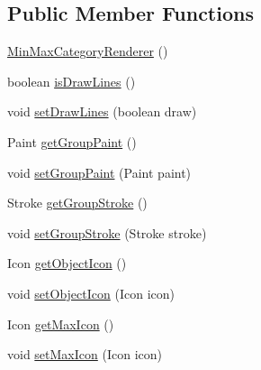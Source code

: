 \subsection*{Public Member Functions}
\begin{DoxyCompactItemize}
\item 
\mbox{\hyperlink{classorg_1_1jfree_1_1chart_1_1renderer_1_1category_1_1_min_max_category_renderer_ab0d03ac160d311fdabb36a5a31b32256}{Min\+Max\+Category\+Renderer}} ()
\item 
boolean \mbox{\hyperlink{classorg_1_1jfree_1_1chart_1_1renderer_1_1category_1_1_min_max_category_renderer_a139adf4191e4232fbc573cf7b41e1b3f}{is\+Draw\+Lines}} ()
\item 
void \mbox{\hyperlink{classorg_1_1jfree_1_1chart_1_1renderer_1_1category_1_1_min_max_category_renderer_a56574945e072d72284090450e075b509}{set\+Draw\+Lines}} (boolean draw)
\item 
Paint \mbox{\hyperlink{classorg_1_1jfree_1_1chart_1_1renderer_1_1category_1_1_min_max_category_renderer_a2f27a761a6930c84f2e979fade45b790}{get\+Group\+Paint}} ()
\item 
void \mbox{\hyperlink{classorg_1_1jfree_1_1chart_1_1renderer_1_1category_1_1_min_max_category_renderer_a15c0d6beff7203d2b49ab160cc7b9124}{set\+Group\+Paint}} (Paint paint)
\item 
Stroke \mbox{\hyperlink{classorg_1_1jfree_1_1chart_1_1renderer_1_1category_1_1_min_max_category_renderer_a4035cc8dee0f3855b46d986e7430cab3}{get\+Group\+Stroke}} ()
\item 
void \mbox{\hyperlink{classorg_1_1jfree_1_1chart_1_1renderer_1_1category_1_1_min_max_category_renderer_a57979a0064c20312d25a3235310c89bf}{set\+Group\+Stroke}} (Stroke stroke)
\item 
Icon \mbox{\hyperlink{classorg_1_1jfree_1_1chart_1_1renderer_1_1category_1_1_min_max_category_renderer_a0f7cfaff627bb78993c0f99d312cdd22}{get\+Object\+Icon}} ()
\item 
void \mbox{\hyperlink{classorg_1_1jfree_1_1chart_1_1renderer_1_1category_1_1_min_max_category_renderer_af86364bce323a2f335493c088181325d}{set\+Object\+Icon}} (Icon icon)
\item 
Icon \mbox{\hyperlink{classorg_1_1jfree_1_1chart_1_1renderer_1_1category_1_1_min_max_category_renderer_a0c66a866bf528c580abd49ff3b8ba808}{get\+Max\+Icon}} ()
\item 
void \mbox{\hyperlink{classorg_1_1jfree_1_1chart_1_1renderer_1_1category_1_1_min_max_category_renderer_a5669d912a023b9cc36f63fc337492409}{set\+Max\+Icon}} (Icon icon)

\end{DoxyCompactItemize}
